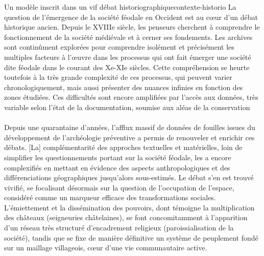 \medskip 
\begin{encadre}{Un modèle inscrit dans un vif débat historiographique}{contexte-historio}
\renewcommand{\thempfootnote}{\alph{mpfootnote}}	
\noindent \og
La question de l'émergence de la société féodale en Occident est au cœur d'un débat historique ancien.
Depuis le XVIIIe siècle, les penseurs cherchent à comprendre le fonctionnement de la société médiévale et à cerner ses fondements.
Les archives sont continûment explorées pour comprendre isolément et précisément les multiples facteurs à l'œuvre dans les processus qui ont fait émerger une société dite \og féodale\fg{} dans le courant des Xe-XIe siècles.
Cette compréhension se heurte toutefois à la très grande complexité de ces processus, qui peuvent varier chronologiquement, mais aussi présenter des nuances infinies en fonction des zones étudiées.
Ces difficultés sont encore amplifiées par l'accès aux données, très variable selon l'état de la documentation, soumise aux aléas de la conservation \textelp{}
\paragraph[espace]{}
Depuis une quarantaine d'années, l'afflux massif de données de fouilles issues du développement de l'archéologie préventive a permis de renouveler et enrichir ces débats.\textelp{}
[La] complémentarité des approches textuelles et matérielles, loin de simplifier les questionnements portant sur la société féodale, les a encore complexifiés en mettant en évidence des aspects anthropologiques et des différenciations géographiques jusqu'alors sous-estimés.
Le débat s'en est trouvé vivifié, se focalisant désormais sur la question de l'occupation de l'espace, considéré comme un marqueur efficace des transformations sociales.
L'émiettement et la dissémination des pouvoirs, dont témoigne la multiplication des châteaux (seigneuries châtelaines), se font concomitamment à l'apparition d'un réseau très structuré d'encadrement religieux (paroissialisation de la société), tandis que se fixe de manière définitive un système de peuplement fondé sur un maillage villageois, cœur d'une vie communautaire active.


\end{encadre}
